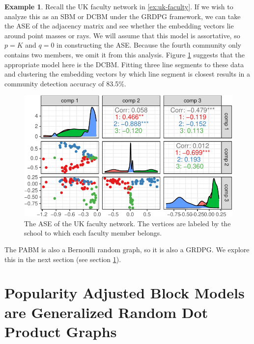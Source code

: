 \documentclass[
  11pt,
]{article}
\theoremstyle{definition}
\theoremstyle{definition}
\newtheorem{example}{Example}[section]
\theoremstyle{definition}
\theoremstyle{definition}
\theoremstyle{remark}
\begin{document}
\begin{example}
Recall the UK faculty network in \ref{ex:uk-faculty}. 
If we wish to analyze this as an SBM or DCBM under the GRDPG framework, we can take the ASE of the adjacency matrix and see whether the embedding vectors lie around point masses or rays. 
We will assume that this model is assortative, so $p = K$ and $q = 0$ in constructing the ASE. 
Because the fourth community only contains two members, we omit it from this analysis. 
Figure \ref{fig:ukfaculty-ase} suggests that the appropriate model here is the DCBM. 
Fitting three line segments to these data and clustering the embedding vectors by which line segment is closest results in a community detection accuracy of 83.5\%. 

\begin{figure}[H]

{\centering \includegraphics{draft_files/figure-latex/ukfaculty-ase-1} 

}

\caption{The ASE of the UK faculty network. The vertices are labeled by the school to which each faculty member belongs.}\label{fig:ukfaculty-ase}
\end{figure}
\end{example}

The PABM is also a Bernoulli random graph, so it is also a GRDPG.
We explore this in the next section (see section \ref{sec:pabm-grdpg}).

\newpage

\hypertarget{sec:pabm-grdpg}{%
\section{Popularity Adjusted Block Models are Generalized Random Dot Product Graphs}\label{sec:pabm-grdpg}}
\end{document}
